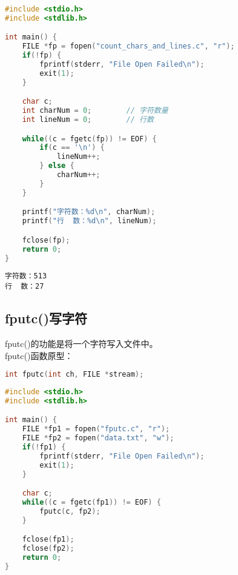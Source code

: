 \vspace{0.5cm}


\begin{lstlisting}[language=C, title=count\_chars\_and\_lines.c]
#include <stdio.h>
#include <stdlib.h>

int main() {
    FILE *fp = fopen("count_chars_and_lines.c", "r");
    if(!fp) {
        fprintf(stderr, "File Open Failed\n");
        exit(1);
    }

    char c;
    int charNum = 0;        // 字符数量
    int lineNum = 0;        // 行数

    while((c = fgetc(fp)) != EOF) {
        if(c == '\n') {
            lineNum++;
        } else {
            charNum++;
        }
    }

    printf("字符数：%d\n", charNum);
    printf("行  数：%d\n", lineNum);

    fclose(fp);
    return 0;
}
\end{lstlisting}

\begin{tcolorbox}
	\begin{verbatim}
字符数：513
行  数：27
	\end{verbatim}
\end{tcolorbox}

\vspace{0.5cm}

\subsection{fputc()写字符}

fputc()的功能是将一个字符写入文件中。\\

fputc()函数原型：

\vspace{-0.5cm}

\begin{lstlisting}[language=C]
int fputc(int ch, FILE *stream);
\end{lstlisting}

\vspace{0.5cm}


\begin{lstlisting}[language=C, title=fputc.c]
#include <stdio.h>
#include <stdlib.h>

int main() {
    FILE *fp1 = fopen("fputc.c", "r");
    FILE *fp2 = fopen("data.txt", "w");
    if(!fp1) {
        fprintf(stderr, "File Open Failed\n");
        exit(1);
    }

    char c;
    while((c = fgetc(fp1)) != EOF) {
        fputc(c, fp2);
    }

    fclose(fp1);
    fclose(fp2);
    return 0;
}
\end{lstlisting}

